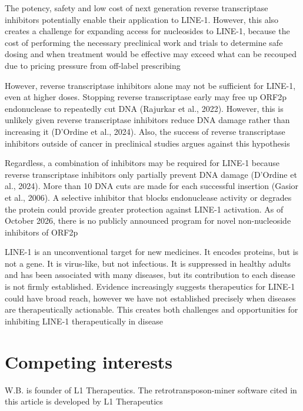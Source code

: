 \documentclass[11pt,twocolumn,twoside]{extarticle}
\begin{document}
The potency, safety and low cost of next generation reverse transcriptase inhibitors potentially enable their application to LINE-1. However, this also creates a challenge for expanding access for nucleosides to LINE-1, because the cost of performing the necessary preclinical work and trials to determine safe dosing and when treatment would be effective may exceed what can be recouped due to pricing pressure from off-label prescribing

However, reverse transcriptase inhibitors alone may not be sufficient for LINE-1, even at higher doses. Stopping reverse transcriptase early may free up ORF2p endonuclease to repeatedly cut DNA (Rajurkar et al., 2022). However, this is unlikely given reverse transcriptase inhibitors reduce DNA damage rather than increasing it (D'Ordine et al., 2024). Also, the success of reverse transcriptase inhibitors outside of cancer in preclinical studies argues against this hypothesis

Regardless, a combination of inhibitors may be required for LINE-1 because reverse transcriptase inhibitors only partially prevent DNA damage (D'Ordine et al., 2024). More than 10 DNA cuts are made for each successful insertion (Gasior et al., 2006). A selective inhibitor that blocks endonuclease activity or degrades the protein could provide greater protection against LINE-1 activation. As of October 2026, there is no publicly announced program for novel non-nucleoside inhibitors of ORF2p

LINE-1 is an unconventional target for new medicines. It encodes proteins, but is not a gene. It is virus-like, but not infectious. It is suppressed in healthy adults and has been associated with many diseases, but its contribution to each disease is not firmly established. Evidence increasingly suggests therapeutics for LINE-1 could have broad reach, however we have not established precisely when diseases are therapeutically actionable. This creates both challenges and opportunities for inhibiting LINE-1 therapeutically in disease


\section{Competing interests}
W.B. is founder of L1 Therapeutics. The retrotransposon-miner software cited in this article is developed by L1 Therapeutics
\end{document}
